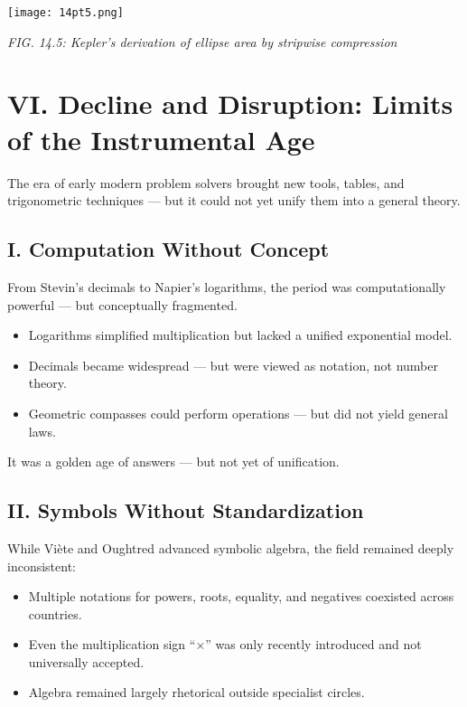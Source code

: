 \documentclass[9pt]{article}
\begin{document}
\begin{center}
    \texttt{[image: 14pt5.png]}

    \textit{FIG. 14.5: Kepler’s derivation of ellipse area by stripwise compression}
\end{center}



\newpage

\section*{VI. Decline and Disruption: Limits of the Instrumental Age}

The era of early modern problem solvers brought new tools, tables, and trigonometric techniques — but it could not yet unify them into a general theory.

\subsection*{I. Computation Without Concept}

From Stevin’s decimals to Napier’s logarithms, the period was computationally powerful — but conceptually fragmented.

\begin{itemize}
    \item Logarithms simplified multiplication but lacked a unified exponential model.
    \item Decimals became widespread — but were viewed as notation, not number theory.
    \item Geometric compasses could perform operations — but did not yield general laws.
\end{itemize}

It was a golden age of answers — but not yet of unification.

\subsection*{II. Symbols Without Standardization}

While Viète and Oughtred advanced symbolic algebra, the field remained deeply inconsistent:

\begin{itemize}
    \item Multiple notations for powers, roots, equality, and negatives coexisted across countries.
    \item Even the multiplication sign ``$\times$'' was only recently introduced and not universally accepted.
    \item Algebra remained largely rhetorical outside specialist circles.
\end{itemize}
\end{document}
